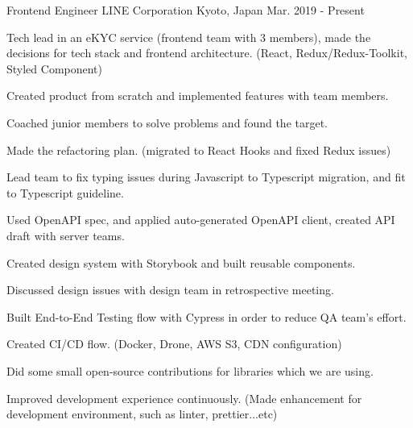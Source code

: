 

\begin{cventries}

  \cventry
    {Frontend Engineer} %
    {LINE Corporation} %
    {Kyoto, Japan} %
    {Mar. 2019 - Present} %
    {
      \begin{cvitems} %
        \item {Tech lead in an eKYC service (frontend team with 3 members), made the decisions for tech stack and frontend architecture. (React, Redux/Redux-Toolkit, Styled Component)}
        \item {Created product from scratch and implemented features with team members.}
        \item {Coached junior members to solve problems and found the target.}
        \item {Made the refactoring plan. (migrated to React Hooks and fixed Redux issues)}
        \item {Lead team to fix typing issues during Javascript to Typescript migration, and fit to Typescript guideline.}
        \item {Used OpenAPI spec, and applied auto-generated OpenAPI client, created API draft with server teams.}
        \item {Created design system with Storybook and built reusable components.}
        \item {Discussed design issues with design team in retrospective meeting.}
        \item {Built End-to-End Testing flow with Cypress in order to reduce QA team's effort.}
        \item {Created CI/CD flow. (Docker, Drone, AWS S3, CDN configuration)}
        \item {Did some small open-source contributions for libraries which we are using.}
        \item {Improved development experience continuously. (Made enhancement for development environment, such as linter, prettier...etc)}
      \end{cvitems}
    }


\end{cventries}
